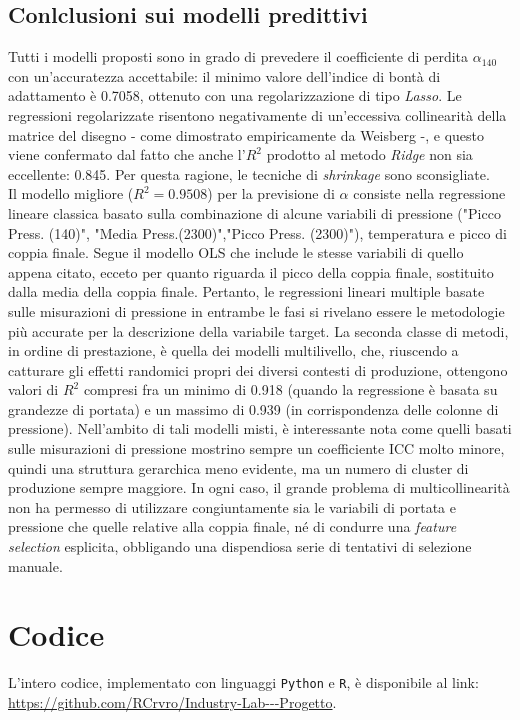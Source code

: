 \documentclass[fleqn,10pt]{SelfArx} %
\begin{document}
\subsection{Conlclusioni sui modelli predittivi}
Tutti i modelli proposti sono in grado di prevedere il coefficiente di perdita $\alpha_{140}$ con un'accuratezza accettabile: il minimo valore dell'indice di bontà di adattamento è 0.7058, ottenuto con una regolarizzazione di tipo \textit{Lasso}. Le regressioni regolarizzate risentono negativamente di un'eccessiva collinearità della matrice del disegno - come dimostrato empiricamente da Weisberg \cite{Wei}\cite{Wei1} -, e questo viene confermato dal fatto che anche l'$R^2$ prodotto al metodo \textit{Ridge} non sia eccellente: 0.845. Per questa ragione, le tecniche di \textit{shrinkage} sono sconsigliate.\\
Il modello migliore ($R^2=0.9508$) per la previsione di $\alpha$ consiste nella regressione lineare classica basato sulla combinazione di alcune variabili di pressione ("Picco Press. (140)", "Media Press.(2300)","Picco Press. (2300)"), temperatura e picco di coppia finale. Segue il modello OLS che include le stesse variabili di quello appena citato, ecceto per quanto riguarda il picco della coppia finale, sostituito dalla media della coppia finale. Pertanto, le regressioni lineari multiple basate sulle misurazioni di pressione in entrambe le fasi si rivelano essere le metodologie più accurate per la descrizione della variabile target. La seconda classe di metodi, in ordine di prestazione, è quella dei modelli multilivello, che, riuscendo a catturare gli effetti randomici propri dei diversi contesti di produzione, ottengono valori di $R^2$ compresi fra un minimo di 0.918 (quando la regressione è basata su grandezze di portata) e un massimo di 0.939 (in corrispondenza delle colonne di pressione). Nell'ambito di tali modelli misti, è interessante nota come quelli basati sulle misurazioni di pressione mostrino sempre un coefficiente ICC molto minore, quindi una struttura gerarchica meno evidente, ma un numero di cluster di produzione sempre maggiore.
In ogni caso, il grande problema di multicollinearità non ha permesso di utilizzare congiuntamente sia le variabili di portata e pressione che quelle relative alla coppia finale, né di condurre una \textit{feature selection} esplicita, obbligando una dispendiosa serie di tentativi di selezione manuale. 
\section*{Codice}
L'intero codice, implementato con linguaggi \texttt{Python} e \texttt{R}, è disponibile al link: \url{https://github.com/RCrvro/Industry-Lab---Progetto}.
\end{document}
